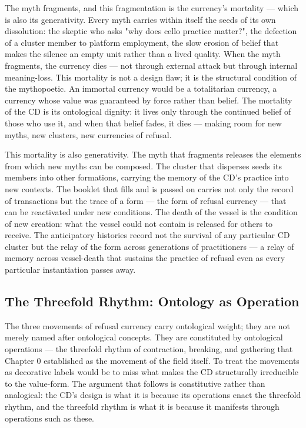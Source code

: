 The myth fragments, and this fragmentation is the currency's mortality — which is also its generativity. Every myth carries within itself the seeds of its own dissolution: the skeptic who asks "why does cello practice matter?", the defection of a cluster member to platform employment, the slow erosion of belief that makes the silence an empty unit rather than a lived quality. When the myth fragments, the currency dies — not through external attack but through internal meaning-loss. This mortality is not a design flaw; it is the structural condition of the mythopoetic. An immortal currency would be a totalitarian currency, a currency whose value was guaranteed by force rather than belief. The mortality of the CD is its ontological dignity: it lives only through the continued belief of those who use it, and when that belief fades, it dies — making room for new myths, new clusters, new currencies of refusal.

This mortality is also generativity. The myth that fragments releases the elements from which new myths can be composed. The cluster that disperses seeds its members into other formations, carrying the memory of the CD's practice into new contexts. The booklet that fills and is passed on carries not only the record of transactions but the trace of a form — the form of refusal currency — that can be reactivated under new conditions. The death of the vessel is the condition of new creation: what the vessel could not contain is released for others to receive. The anticipatory histories record not the survival of any particular CD cluster but the relay of the form across generations of practitioners — a relay of memory across vessel-death that sustains the practice of refusal even as every particular instantiation passes away.

\subsection{The Threefold Rhythm: Ontology as Operation}

The three movements of refusal currency carry ontological weight; they are not merely named after ontological concepts. They are constituted by ontological operations — the threefold rhythm of contraction, breaking, and gathering that Chapter 0 established as the movement of the field itself. To treat the movements as decorative labels would be to miss what makes the CD structurally irreducible to the value-form. The argument that follows is constitutive rather than analogical: the CD's design is what it is because its operations enact the threefold rhythm, and the threefold rhythm is what it is because it manifests through operations such as these.

